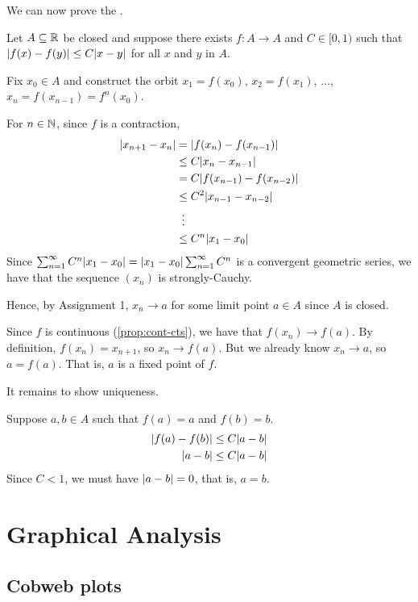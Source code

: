 \documentclass[class=pmath370,tikz,notes]{agony}
\begin{document}
We can now prove the .

\begin{prf}
  Let $A \subseteq \mathbb{R}$ be closed and suppose there exists
  $f : A \to A$ and $C \in [0,1)$ such that $\abs{f(x) - f(y)} \leq C\abs{x-y}$
  for all $x$ and $y$ in $A$.

  Fix $x_0 \in A$ and construct the orbit
  $x_1 = f(x_0)$, $x_2 = f(x_1)$, $\dotsc$, $x_n = f(x_{n-1}) = f^n(x_0)$.

  For $n \in \mathbb{N}$, since $f$ is a contraction,
  \begin{align*}
    \abs{x_{n+1} - x_n}
     & = \abs{f(x_n) - f(x_{n-1})}      \\
     & \leq C\abs{x_n - x_{n-1}}        \\
     & = C\abs{f(x_{n-1}) - f(x_{n-2})} \\
     & \leq C^2\abs{x_{n-1} - x_{n-2}}  \\
     & \vdotswithin{=}                  \\
     & \leq C^n\abs{x_1 - x_0}
  \end{align*}
  Since $\sum_{n=1}^\infty C^n\abs{x_1-x_0} = \abs{x_1-x_0}\sum_{n=1}^\infty C^n$
  is a convergent geometric series, we have that the sequence $(x_n)$ is strongly-Cauchy.

  Hence, by Assignment 1, $x_n \to a$ for some limit point $a \in A$ since $A$ is closed.

  Since $f$ is continuous (\cref{prop:cont-cts}), we have that $f(x_n) \to f(a)$.
  By definition, $f(x_n) = x_{n+1}$, so $x_n \to f(a)$.
  But we already know $x_n \to a$, so $a = f(a)$.
  That is, $a$ is a fixed point of $f$.

  It remains to show uniqueness.

  Suppose $a,b \in A$ such that $f(a) = a$ and $f(b) = b$.
  \begin{align*}
    \abs{f(a) - f(b)} & \leq C\abs{a-b} \\
    \abs{a-b}         & \leq C\abs{a-b}
  \end{align*}
  Since $C < 1$, we must have $\abs{a-b} = 0$, that is, $a = b$.
\end{prf}

\chapter{Graphical Analysis}

\section{Cobweb plots}
\end{document}
